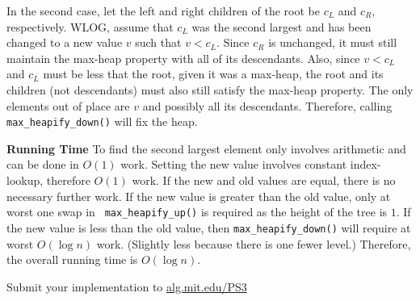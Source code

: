 \documentclass[12pt,twoside]{article}
\begin{document}
\begin{problems}
\begin{problemparts}
    In the second case, let the left and right children of the root be $ c_L
    $ and $ c_R $, respectively. WLOG, assume that $ c_L $ was the second
    largest and has been changed to a new value $ v $ such that $ v < c_L $.
    Since $ c_R $ is unchanged, it must still maintain the max-heap property
    with all of its descendants. Also, since $ v < c_L $ and $ c_L $ must be
    less that the root, given it was a max-heap, the root and its children
    (not descendants) must also still satisfy the max-heap property. The only
    elements out of place are $ v $ and possibly all its descendants.
    Therefore, calling {\tt max\_heapify\_down()} will fix the heap.

    \smallbreak

    {\bf Running Time} To find the second largest element only involves
    arithmetic and can be done in $ O(1) $ work. Setting the new value
    involves constant index-lookup, therefore $ O(1) $ work. If the new and
    old values are equal, there is no necessary further work. If the new
    value is greater than the old value, only at worst one swap in {\tt
    max\_heapify\_up()} is required as the height of the tree is $ 1 $. If
    the new value is less than the old value, then {\tt max\_heapify\_down()}
    will require at worst $ O(\log n) $ work. (Slightly less because there is
    one fewer level.) Therefore, the overall running time is $ O(\log n) $.

\end{problemparts}

\newpage
\problem  %

\begin{problemparts}
\problempart %
\problempart %
\problempart %
\problempart %
\end{problemparts}

\newpage
\problem  %

\begin{problemparts}
\problempart %
\problempart %
\problempart Submit your implementation to {\small\url{alg.mit.edu/PS3}}
\end{problemparts}

\end{problems}
\end{document}

